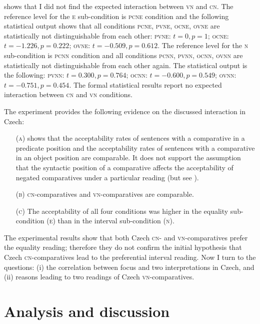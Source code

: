 \documentclass[output=paper,
]{langscibook}
\begin{document}
 shows that I did not find the expected interaction between \textsc{vn} and \textsc{cn}. The reference level for the \textsc{e} sub-condition is \textsc{pcne} condition and the following statistical output shows that all conditions \textsc{pcne, pvne, ocne, ovne} are statistically not distinguishable from each other: \textsc{pvne:} $t= 0, p = 1$; \textsc{ocne:} $t=-1.226,p = 0.222$; \textsc{ovne:} $t = -0.509, p = 0.612$. The reference level for the \textsc{n} sub-condition is \textsc{pcnn} condition and all conditions \textsc{pcnn, pvnn, ocnn, ovnn} are statistically not distinguishable from each other again. The statistical output is the following: \textsc{pvnn:} $t = 0.300, p = 0.764$; \textsc{ocnn:} $t = -0.600, p = 0.549$; \textsc{ovnn:} $t = -0.751, p = 0.454$. The formal statistical results report no expected interaction between \textsc{cn} and \textsc{vn} conditions.

The experiment provides the following evidence on the discussed interaction in Czech:

\begin{itemize}
\item[(\textsc{a})]  shows that the acceptability rates of sentences with a comparative in a predicate position and the acceptability rates of sentences with a comparative in an object position are comparable. It does not support the assumption that the syntactic position of a comparative affects the acceptability of negated comparatives under a particular reading
(but see \citealt{kadmon2001formal}).

\item[(\textsc{b})] \textsc{cn-}comparatives and \textsc{vn-}comparatives are comparable.

\item[(\textsc{c})] The acceptability of all four conditions was higher in the equality sub-condition (\textsc{e}) than in the interval sub-condition (\textsc{n}).
\end{itemize}

\noindent The experimental results show that both Czech \textsc{cn-} and \textsc{vn-}comparatives prefer the equality reading; therefore they do not confirm the initial hypothesis that Czech \textsc{cn-}comparati\-ves lead to the preferential interval reading. Now I turn to the questions: (i) the correlation between focus and two interpretations in Czech, and (ii) reasons leading to two readings of Czech \textsc{vn-}comparatives.


\section{Analysis and discussion}
\end{document}
